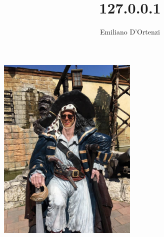 \documentclass{article}
\author{Emiliano D'Ortenzi}
\title{127.0.0.1}
\begin{document}
	\begin{picture}[h!]
	\includegraphics[width=0.5\textwidth]{foto.jpg}
	\label{me}
	\end{picture}
\end{document}
